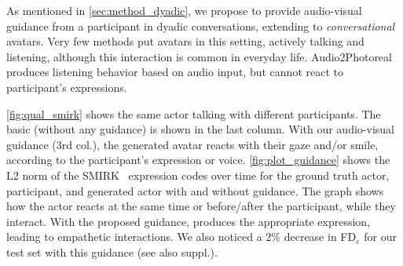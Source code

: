 As mentioned in \cref{sec:method_dyadic}, we propose to provide audio-visual guidance from a participant in dyadic conversations, extending \MethodName to \textit{conversational} avatars. Very few methods put avatars in this setting, actively talking and listening, although this interaction is common in everyday life. Audio2Photoreal~\cite{ng2024audio2photoreal} produces listening behavior based on audio input, but cannot react to participant's expressions.

\cref{fig:qual_smirk} shows the same actor talking with different participants. The basic \MethodName (without any guidance) is shown in the last column. With our audio-visual guidance (3rd col.), the generated avatar reacts with their gaze and/or smile, according to the participant's expression or voice.  
\cref{fig:plot_guidance} shows the L2 norm of the SMIRK~\cite{SMIRK:CVPR:2024} expression codes over time for the ground truth actor, participant, and generated actor with and without guidance. The graph shows how the actor reacts at the same time or before/after the participant, while they interact. With the proposed guidance, \MethodName produces the appropriate expression, leading to empathetic interactions. We also noticed a $2\%$ decrease in FD$_{e}$ for our test set with this guidance (see also suppl.).
















